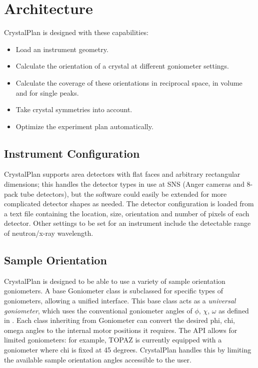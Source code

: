 \documentclass[final]{iucr}              %
\begin{document}
\section{Architecture}

CrystalPlan is designed with these capabilities:

\begin{itemize}
  \item Load an instrument geometry.
  \item Calculate the orientation of a crystal at different goniometer settings.
  \item Calculate the coverage of these orientations in reciprocal space,
  in volume and for single peaks.
  \item Take crystal symmetries into account.
  \item Optimize the experiment plan automatically.
\end{itemize}

\subsection{Instrument Configuration}

CrystalPlan supports area detectors with flat faces and arbitrary rectangular
dimensions; this handles the detector types in use at SNS (Anger cameras and
8-pack tube detectors), but the software could easily be extended for more
complicated detector shapes as needed. The detector configuration is loaded from
a text file containing the location, size, orientation and number of pixels of
each detector. Other settings to be set for an instrument include the
detectable range of neutron/x-ray wavelength.


\subsection{Sample Orientation}

CrystalPlan is designed to be able to use a variety of sample orientation
goniometers. A base Goniometer class is subclassed for specific types of
goniometers, allowing a unified interface. This base class acts as a
\emph{universal goniometer},
which uses the conventional goniometer angles of
$\phi$, $\chi$, $\omega$ as defined in \cite{busing67}.
Each class inheriting from Goniometer can convert
the desired phi, chi, omega angles to the internal motor positions it requires. The API allows
for limited goniometers: for example, TOPAZ is currently equipped with a
goniometer where chi is fixed at 45 degrees. CrystalPlan handles this by
limiting the available sample orientation angles accessible to the user.        
   
\end{document}
